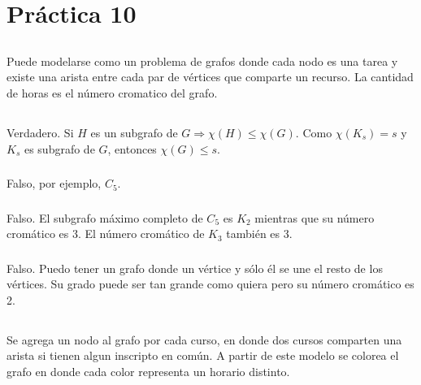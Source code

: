 \section{Práctica 10}

\setcounter{subsection}{1}
\subsection{}
Puede modelarse como un problema de grafos donde cada nodo es una tarea y existe una arista entre cada par de vértices que comparte un recurso. La cantidad de horas es el número cromatico del grafo.

\subsection{}
\subsubsection{}
Verdadero. Si $H$ es un subgrafo de $G \Longrightarrow \chi(H) \leq \chi(G)$. Como $\chi(K_s) = s$ y $K_s$ es subgrafo de $G$, entonces $\chi(G) \leq s$.

\subsubsection{}
Falso, por ejemplo, $C_5$.

\subsubsection{}
Falso. El subgrafo máximo completo de $C_5$ es $K_2$ mientras que su número cromático es 3. El número cromático de $K_3$ también es 3.

\subsubsection{}
Falso. Puedo tener un grafo donde un vértice y sólo él se une el resto de los vértices. Su grado puede ser tan grande como quiera pero su número cromático es 2.

\subsection{}
Se agrega un nodo al grafo por cada curso, en donde dos cursos comparten una arista si tienen algun inscripto en común. A partir de este modelo se colorea el grafo en donde cada color representa un horario distinto.


